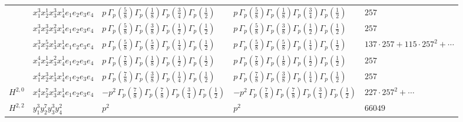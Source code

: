 \documentclass[11pt]{article}
\begin{document}
\begin{table}[ht]
{\begin{tabular}{@{}lllll@{}}
 & $x_{1}^{3} x_{2}^{1} x_{3}^{3} x_{4}^{1}  e_{1} e_{2} e_{3} e_{4}$ & $p \, \Gamma_p \left( \frac{5}{8} \right) \Gamma_p \left( \frac{1}{8} \right) \Gamma_p \left( \frac{3}{4} \right) \Gamma_p \left( \frac{1}{2} \right)$ & $p \, \Gamma_p \left( \frac{5}{8} \right) \Gamma_p \left( \frac{1}{8} \right) \Gamma_p \left( \frac{3}{4} \right) \Gamma_p \left( \frac{1}{2} \right)$ & $257$ \\
 & $x_{1}^{3} x_{2}^{3} x_{3}^{2} x_{4}^{1}  e_{1} e_{2} e_{3} e_{4}$ & $p \, \Gamma_p \left( \frac{5}{8} \right) \Gamma_p \left( \frac{3}{8} \right) \Gamma_p \left( \frac{1}{2} \right) \Gamma_p \left( \frac{1}{2} \right)$ & $p \, \Gamma_p \left( \frac{5}{8} \right) \Gamma_p \left( \frac{3}{8} \right) \Gamma_p \left( \frac{1}{2} \right) \Gamma_p \left( \frac{1}{2} \right)$ & $257$ \\
 & $x_{1}^{3} x_{2}^{5} x_{3}^{1} x_{4}^{1}  e_{1} e_{2} e_{3} e_{4}$ & $p \, \Gamma_p \left( \frac{5}{8} \right) \Gamma_p \left( \frac{5}{8} \right) \Gamma_p \left( \frac{1}{4} \right) \Gamma_p \left( \frac{1}{2} \right)$ & $p \, \Gamma_p \left( \frac{5}{8} \right) \Gamma_p \left( \frac{5}{8} \right) \Gamma_p \left( \frac{1}{4} \right) \Gamma_p \left( \frac{1}{2} \right)$ & $137{\cdot}257{+}115{\cdot}257^{2}{+}\cdots$ \\
 & $x_{1}^{4} x_{2}^{1} x_{3}^{2} x_{4}^{1}  e_{1} e_{2} e_{3} e_{4}$ & $p \, \Gamma_p \left( \frac{7}{8} \right) \Gamma_p \left( \frac{1}{8} \right) \Gamma_p \left( \frac{1}{2} \right) \Gamma_p \left( \frac{1}{2} \right)$ & $p \, \Gamma_p \left( \frac{7}{8} \right) \Gamma_p \left( \frac{1}{8} \right) \Gamma_p \left( \frac{1}{2} \right) \Gamma_p \left( \frac{1}{2} \right)$ & $257$ \\
 & $x_{1}^{4} x_{2}^{3} x_{3}^{1} x_{4}^{1}  e_{1} e_{2} e_{3} e_{4}$ & $p \, \Gamma_p \left( \frac{7}{8} \right) \Gamma_p \left( \frac{3}{8} \right) \Gamma_p \left( \frac{1}{4} \right) \Gamma_p \left( \frac{1}{2} \right)$ & $p \, \Gamma_p \left( \frac{7}{8} \right) \Gamma_p \left( \frac{3}{8} \right) \Gamma_p \left( \frac{1}{4} \right) \Gamma_p \left( \frac{1}{2} \right)$ & $257$ \\
\midrule
$H^{2,0}$ & $x_{1}^{4} x_{2}^{7} x_{3}^{3} x_{4}^{1}  e_{1} e_{2} e_{3} e_{4}$ & $- p^{2} \, \Gamma_p \left( \frac{7}{8} \right) \Gamma_p \left( \frac{7}{8} \right) \Gamma_p \left( \frac{3}{4} \right) \Gamma_p \left( \frac{1}{2} \right)$ & $- p^{2} \, \Gamma_p \left( \frac{7}{8} \right) \Gamma_p \left( \frac{7}{8} \right) \Gamma_p \left( \frac{3}{4} \right) \Gamma_p \left( \frac{1}{2} \right)$ & $227{\cdot}257^{2}{+}\cdots$ \\
\midrule
$H^{2,2}$ & $y_{1}^{3} y_{2}^{7} y_{3}^{3} y_{4}^{2}$ & $p^{2} \,$ & $p^{2} \,$ & $66049$ \\
\bottomrule
\end{tabular}
}
\renewcommand{\arraystretch}{1.0}
\end{table}
\end{document}
